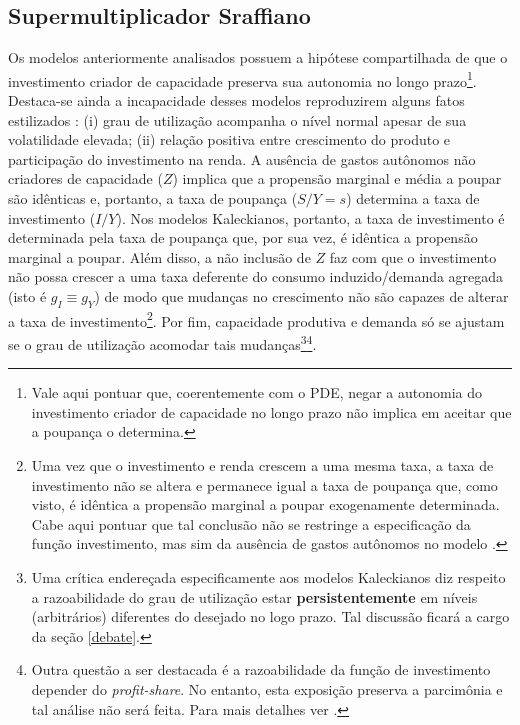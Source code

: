 \subsection{Supermultiplicador Sraffiano}

Os modelos anteriormente analisados possuem a hipótese compartilhada de que o investimento criador de capacidade preserva sua autonomia no longo prazo\footnote{Vale aqui pontuar que, coerentemente com o PDE, negar a autonomia do investimento criador de capacidade no longo prazo não implica em aceitar que a poupança o determina.}.  Destaca-se ainda a incapacidade desses modelos reproduzirem alguns fatos estilizados \cite[p.~5]{fagundes_role_2017}: (i) grau de utilização acompanha o nível normal apesar de sua volatilidade elevada; (ii) relação positiva entre crescimento do produto e participação do investimento na renda. A ausência de gastos autônomos não criadores de capacidade ($Z$) implica que a propensão marginal e média a poupar são idênticas e, portanto, a taxa de poupança ($S/Y = s$) determina a taxa de investimento ($I/Y$). Nos modelos Kaleckianos, portanto, a taxa de investimento é determinada pela taxa de poupança que, por sua vez, é idêntica a propensão marginal a poupar. Além disso, a não inclusão de $Z$ faz com que o investimento não possa crescer a uma taxa deferente do consumo induzido/demanda agregada (isto é $g_I \equiv g_Y$) de modo que mudanças no crescimento não são capazes de alterar a taxa de investimento\footnote{Uma vez que o investimento e renda crescem a uma mesma taxa, a taxa de investimento não se altera e permanece igual a taxa de poupança que, como visto, é idêntica a propensão marginal a poupar exogenamente determinada. Cabe aqui pontuar que tal conclusão não se restringe a especificação da função investimento, mas sim da ausência de gastos autônomos no modelo \textcite[p.~85]{serrano_sraffian_2017}.}. Por fim, capacidade produtiva e demanda só se ajustam se o grau de utilização acomodar tais mudanças\cite[p.~84--86]{serrano_sraffian_2017}\footnote{Uma crítica endereçada especificamente aos modelos Kaleckianos diz respeito a razoabilidade do grau de utilização estar \textbf{persistentemente} em níveis (arbitrários) diferentes do desejado no logo prazo. Tal discussão ficará a cargo da seção \ref{debate}.}\footnote{Outra questão a ser destacada é a razoabilidade da função de investimento depender do \textit{profit-share}. No entanto, esta exposição preserva a parcimônia e tal análise não será feita. Para mais detalhes ver \textcite[p.~88]{serrano_sraffian_2017}.}.


